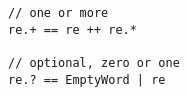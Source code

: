 \begin{lstlisting}[style=scalaioScala]
// one or more
re.+ == re ++ re.*

// optional, zero or one
re.? == EmptyWord | re
\end{lstlisting}
